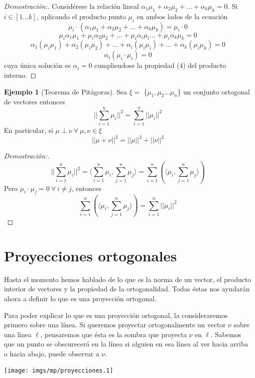 \documentclass[11pt]{article}
\newcommand{\norma}[1]{\lvert\lvert#1\lvert\rvert}
\theoremstyle{definition}
\newtheorem{ejemplo}[ejm]{Ejemplo}
\begin{document}
\begin{proof}[Demostración:]
	Considérese la relación lineal $\alpha_1 \mu_1+\alpha_2 \mu_2+\dots +\alpha_k \mu_k=0$. Si $i \in [1 \dots k ]$, aplicando el producto punto $\mu_i$ en ambos lados de la ecuación
\[\mu_i \cdot ( \alpha_1 \mu_1+\alpha_2 \mu_2+\dots +\alpha_k \mu_k)= \mu_i \cdot 0\]
\[\mu_i \alpha_1\mu_1+\mu_i\alpha_2\mu_2+\dots+\mu_i\alpha_i\mu_i\dots+\mu_i\alpha_k\mu_k = 0\]
\[\alpha_1(\mu_i\mu_1)+\alpha_2(\mu_i\mu_2)+\dots+\alpha_i(\mu_i\mu_i)+\dots+\alpha_k(\mu_i\mu_k) = 0\]
\[\alpha_i(\mu_i\cdot\mu_i) = 0\]
	cuya única solución es $\alpha_i = 0$ cumpliendose la propiedad (4) del producto interno.
\end{proof}

\begin{ejemplo}[Teorema de Pitágoras] 
	Sea $\xi = $ \{$\mu_1,\mu_2\dots\mu_n$\} un conjunto ortogonal de vectores entonces
	\[\norma{\displaystyle\sum_{i=1}^n\mu_i}^2 = \displaystyle\sum_{i=1}^n\norma{\mu_i}^2\]
En particular, si $\mu\perp\nu \: \forall \: \mu,\nu \in \xi$
	\[\norma{\mu+\nu}^2 = \norma{\mu}^2+\norma{\nu}^2\]
\begin{proof}[Demostración:]
	\[\norma{\displaystyle\sum_{i=1}^n\mu_i}^2 = \langle\displaystyle\sum_{i=1}^n\mu_i,\displaystyle\sum_{j=1}^n\mu_j\rangle = \displaystyle\sum_{i=1}^n(\langle\mu_i,\displaystyle\sum_{j=1}^n\mu_j\rangle)\]
Pero $\mu_i\cdot\mu_j = 0 \: \forall \: i\neq j$, entonces
\[\displaystyle\sum_{i=1}^n(\langle\mu_i,\displaystyle\sum_{j=1}^n\mu_j\rangle) = \displaystyle\sum_{i=1}^n\norma{\mu_i}^2\]\qedhere
\end{proof}
\end{ejemplo}

\section*{Proyecciones ortogonales}
Hasta el momento hemos hablado de lo que es la norma de un vector, el producto interior de vectores y la propiedad de la ortogonalidad. Todas éstas nos ayudarán ahora a definir lo que es una proyección ortogonal.

Para poder explicar lo que es una proyección ortogonal, la consideraremos primero sobre una línea. Si queremos proyectar ortogonalmente un vector $\nu$ sobre una línea $\ell$, pensaremos que ésta es la sombra que proyecta $\nu$ en $\ell$. Sabemos que un punto se obscurecerá en la línea si alguien en esa línea al ver hacia arriba o hacia abajo, puede observar a $\nu$.

\begin{center}
\texttt{[image: imgs/mp/proyecciones.1]}
\end{center}
\end{document}
